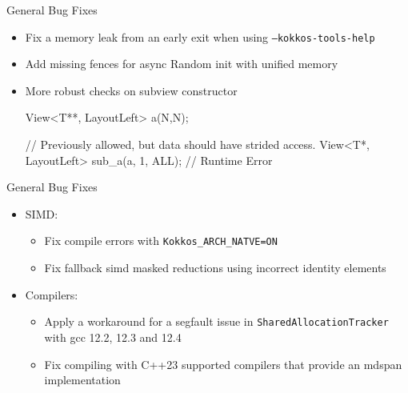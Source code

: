 \begin{frame}[fragile]{General Bug Fixes}
    \begin{itemize}
      \item Fix a memory leak from an early exit when using \texttt{--kokkos-tools-help} %
      \item Add missing fences for async Random init with unified memory %
      \item More robust checks on subview constructor
        \begin{code}[keywords={std}]
View<T**, LayoutLeft> a(N,N);

// Previously allowed, but data should have strided access.
View<T*, LayoutLeft> sub_a(a, 1, ALL); // Runtime Error
        \end{code}

    \end{itemize}
\end{frame}






\begin{frame}[fragile]{General Bug Fixes}
  \begin{itemize}
    \item SIMD:
    \begin{itemize}
      \item Fix compile errors with \texttt{Kokkos\_ARCH\_NATVE=ON} %
      \item Fix fallback simd masked reductions using incorrect identity elements %
    \end{itemize}
    \item Compilers:
    \begin{itemize}
      \item Apply a workaround for a segfault issue in \texttt{SharedAllocationTracker} with gcc 12.2, 12.3 and 12.4 %
      \item Fix compiling with C++23 supported compilers that provide an mdspan implementation %
    \end{itemize}
  \end{itemize}
\end{frame}

